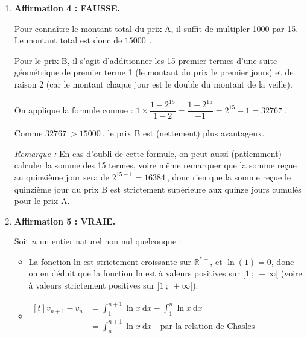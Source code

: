 \documentclass[10pt]{article}
\providecommand{\euro}{\texteuro}
\providecommand{\R}{\mathbb{R}}
\providecommand{\np}[2][]{{#2~#1}}
\providecommand{\euro}{{\text{€}}}
\renewcommand{\euro}{\ifmmode\text{\texteuro}\else\texteuro\fi}
\begin{document}
\begin{enumerate}
	Puis, la boucle \texttt{for} va s'exécuter \texttt{N} fois, ici donc 4 fois, avec le compteur \texttt{i} qui va prendre les valeurs entières entre 0 et \texttt{N-1}, donc ici 0, 1, 2 et 3.

	\begin{itemize}
		\item La première exécution \og modifie\fg{} \texttt{U} en \texttt{U + 0}, la valeur reste égale à 1;
		\item La deuxième exécution modifie \texttt{U} en \texttt{U + 1}, la valeur devient égale à $1 + 1 = 2$;
		\item La troisième exécution modifie \texttt{U} en \texttt{U + 2}, la valeur devient égale à $2 + 2 = 4$;
		\item La dernière exécution modifie \texttt{U} en \texttt{U + 3}, la valeur devient égale à $4 + 3 = 7$.
	\end{itemize}

	On a donc bien la valeur 7 renvoyée par cet appel.
	\item \textbf{Affirmation 4 : FAUSSE.}

	Pour connaître le montant total du prix A, il suffit de multipler 1000 par 15. Le montant total est donc de $\np{15000}$\,\euro{}.

	Pour le prix B, il s'agit d'additionner les 15 premier termes d'une suite géométrique de premier terme 1 (le montant du prix le premier jours) et de raison 2 (car le montant chaque jour est le double du montant de la veille).

	On applique la formule connue : \quad $1 \times \dfrac{1 - 2^{15}}{1 - 2} =\dfrac{1-2^{15}}{-1} = 2^{15} - 1 = \np{32767}$.

	Comme $\np{32767} > \np{15000}$, le prix B est (nettement) plus avantageux.

	\emph{Remarque :} En cas d'oubli de cette formule, on peut aussi (patiemment) calculer la somme des 15 termes, voire même remarquer que la somme reçue au quinzième jour sera de $2^{15 - 1} = \np{16384}$, donc rien que la somme reçue le quinzième jour du prix B est strictement supérieure aux quinze jours cumulés pour le prix A.

	\item \textbf{Affirmation 5 : VRAIE.}

	Soit $n$ un entier naturel non nul quelconque :

	\begin{itemize}
		\item La fonction ln est strictement croissante sur $\R^{*+}$, et $\ln(1) = 0$, donc on en déduit que la fonction ln est à valeurs positives sur $[1 ~;~ +\infty[$ (voire à valeurs strictement positives sur $]1~;~ +\infty[$).
		\item $\begin{aligned}[t] \displaystyle v_{n+1}	- v_n &= \int_{1}^{n+1} \ln x \:\mathrm{d} x - \int_{1}^{n} \ln x \:\mathrm{d} x \\
		&= \int_{n}^{n+1} \ln x \:\mathrm{d} x \quad\text{par la relation de Chasles} \end{aligned}$


\end{itemize}
\end{enumerate}
\end{document}
